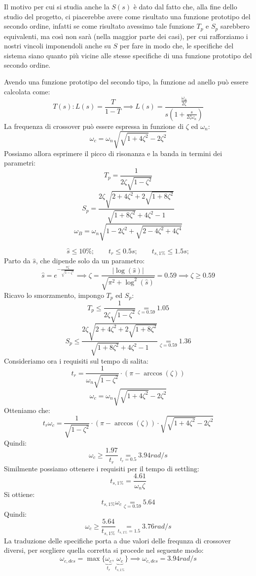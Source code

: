 \documentclass[12pt]{article}
\begin{document}
Il motivo per cui si studia anche la $S(s)$ \`e dato dal fatto che, alla fine dello studio del progetto, ci piacerebbe avere come risultato una funzione prototipo del secondo ordine, infatti se come risultato avessimo tale funzione $T_p$ e $S_p$ sarebbero equivalenti, ma cos\`i non sar\`a (nella maggior parte dei casi), per cui rafforziamo i nostri vincoli imponendoli anche su $S$ per fare in modo che, le specifiche del sistema siano quanto pi\`u vicine alle stesse specifiche di una funzione prototipo del secondo ordine.

Avendo una funzione prototipo del secondo tipo, la funzione ad anello pu\`o essere calcolata come:
\[ T(s): L(s) = \frac{T}{1 - T} \implies L(s) = \frac{\frac{\omega_n}{2\zeta} }{s \left( 1 + \frac{s}{2\zeta\omega_n}  \right) }  \]
La frequenza di crossover pu\`o essere espressa in funzione di $\zeta$ ed $\omega_n$:
\[ \boxed{ \omega_c = \omega_n \sqrt{\sqrt{1 + 4\zeta^{2}} - 2\zeta^{2}}  } \]
Possiamo allora esprimere il picco di risonanza e la banda in termini dei parametri:
\[ \boxed{T_p = \frac{1}{2\zeta\sqrt{1-\zeta^{2}}} } \]
\[ \boxed{S_p = \frac{2\zeta \sqrt{2 + 4\zeta^{2} + 2 \sqrt{1 + 8\zeta^{2}}}}{\sqrt{1 + 8\zeta^{2}} + 4\zeta^{2} - 1} } \]
\[ \boxed{\omega_B = \omega_n \sqrt{1 - 2\zeta^{2} + \sqrt{2 - 4\zeta^{2} + 4\zeta^{4}}}} \]


\begin{example}{}{}
    \[ \hat{s} \leqslant 10\%;\qquad t_r \leqslant 0.5s;\qquad t_{s,1\%} \leqslant 1.5s; \]
    Parto da $\hat{s}$, che dipende solo da un parametro:
\[ \hat{s} = e^{-\frac{\pi\zeta}{\sqrt{1 - \zeta^{2}}} } \implies \zeta = \frac{|\log(\hat{s})|}{\sqrt{\pi^{2} + \log^{2}(\hat{s})}} = 0.59 \implies \boxed{\zeta \geqslant  0.59 } \]
    Ricavo lo smorzamento, impongo $T_p$ ed $S_p$:
    \[ \boxed{T_p \leqslant \frac{1}{2\zeta\sqrt{1-\zeta^{2}}} \underset{\zeta = 0.59}{=} 1.05} \] 
    \[ \boxed{S_p \leqslant \frac{2\zeta \sqrt{2 + 4\zeta^{2} + 2 \sqrt{1 + 8\zeta^{2}}}}{\sqrt{1 + 8\zeta^{2}} + 4\zeta^{2} - 1} \underset{\zeta = 0.59}{=} 1.36} \]
    Consideriamo ora i requisiti sul tempo di salita:
    \[  t_r = \frac{1}{\omega_n\sqrt{1-\zeta^{2}}} \cdot (\pi - \arccos(\zeta))  \]
    \[   \omega_c = \omega_n \sqrt{\sqrt{1 + 4\zeta^{2}} - 2\zeta^{2}}  \]
    Otteniamo che:
    \[ t_r\omega_c =  \frac{1}{\sqrt{1-\zeta^{2}}} \cdot (\pi - \arccos(\zeta)) \cdot \sqrt{\sqrt{1 + 4\zeta^{2}} - 2\zeta^{2}} \]
    Quindi:
    \[ \boxed{\omega_c \geqslant \frac{1.97}{t_r} \underset{t_r = 0.5}{=} 3.94 rad/s} \]
    Similmente possiamo ottenere i requisiti per il tempo di settling:
    \[ t_{s,1\%} = \frac{4.61}{\omega_n\zeta}  \]
    Si ottiene:
    \[ t_{s,1\%}\omega_c \underset{\zeta = 0.59}{=} 5.64 \]
    Quindi:
    \[ \boxed{\omega_c \geqslant  \frac{5.64}{t_{s,1\%}} \underset{t_{s,1\%} = 1.5}{=} 3.76 rad/s} \]
    La traduzione delle specifiche porta a due valori delle frequnza di crossover diversi, per scegliere quella corretta si procede nel seguente modo:
    \[ \boxed{ \omega _{c,des} = \max\{ \underbrace{\omega_c}_{t_r}, \underbrace{\omega_c}_{t_{s,1\%}} \} \implies \omega_{c,des} = 3.94 rad/s } \]
\end{example}
\end{document}
